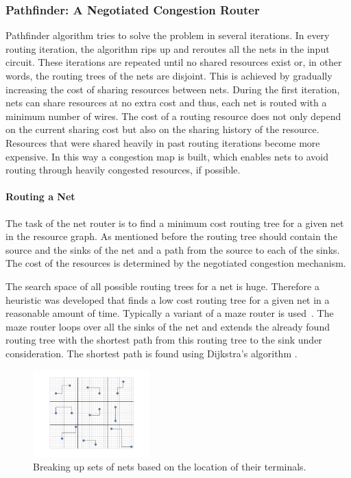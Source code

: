 \documentclass[a4paper,oneside,12pt]{article}
\begin{document}
\subsubsection{Pathfinder: A Negotiated Congestion Router}
\label{sec:pathfinder}
Pathfinder algorithm \cite{pathfinder} tries to solve the problem in several iterations. In every routing iteration, the algorithm rips up and reroutes all the nets in the input circuit. These iterations are repeated until no shared resources exist \cite{nair1987asyetfgw} or, in other words, the routing trees of the nets are disjoint. This is achieved by gradually increasing the cost of sharing resources between nets. During the first iteration, nets can share resources at no extra cost and thus, each net is routed with a minimum number of wires. The cost of a routing resource does not only depend on the current sharing cost but also on the sharing history of the resource. Resources that were shared heavily in past routing iterations become more expensive. In this way a congestion map is built, which enables nets to avoid routing through heavily congested resources, if possible.

\paragraph{Routing a Net}
\label{sec:netRouter}
The task of the net router is to find a minimum cost routing tree for a given net in the resource graph. As mentioned before the routing tree should contain the source and the sinks of the net and a path from the source to each of the sinks. The cost of the resources is determined by the negotiated congestion mechanism.

The search space of all possible routing trees for a net is huge. Therefore a heuristic was developed that finds a low cost routing tree for a given net in a reasonable amount of time. Typically a variant of a maze router is used~\cite{lee1961aafpcaia}. The maze router loops over all the sinks of the net and extends the already found routing tree with the shortest path from this routing tree to the sink under consideration. The shortest path is found using Dijkstra's algorithm \cite{dijkstra1959anotpicwg}.

\begin{figure}[ht]
\centering
\includegraphics[width = 0.4\textwidth,trim = 0mm 0mm 0mm 0mm, clip]{parallellisatie}
\caption{Breaking up sets of nets based on the location of their terminals.}
\label{geopara}
\end{figure}
\end{document}
